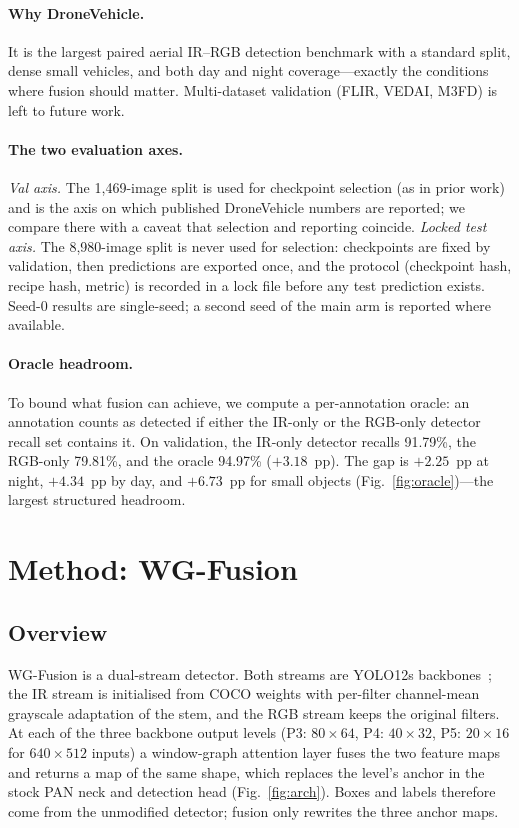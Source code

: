 \documentclass[10pt,twocolumn,letterpaper]{article}
\begin{document}
\paragraph{Why DroneVehicle.}
It is the largest paired aerial IR--RGB detection benchmark with a standard
split, dense small vehicles, and both day and night coverage---exactly the
conditions where fusion should matter. Multi-dataset validation (FLIR, VEDAI,
M3FD) is left to future work.

\paragraph{The two evaluation axes.}
\emph{Val axis.} The 1{,}469-image split is used for checkpoint selection (as
in prior work) and is the axis on which published DroneVehicle numbers are
reported; we compare there with a caveat that selection and reporting coincide.
\emph{Locked test axis.} The 8{,}980-image split is never used for selection:
checkpoints are fixed by validation, then predictions are exported once, and
the protocol (checkpoint hash, recipe hash, metric) is recorded in a lock file
before any test prediction exists. Seed-0 results are single-seed; a second
seed of the main arm is reported where available.

\paragraph{Oracle headroom.}
To bound what fusion can achieve, we compute a per-annotation oracle: an
annotation counts as detected if either the IR-only or the RGB-only detector
recall set contains it. On validation, the IR-only detector recalls 91.79\%,
the RGB-only 79.81\%, and the oracle 94.97\% ($+3.18$~pp). The gap is
$+2.25$~pp at night, $+4.34$~pp by day, and $+6.73$~pp for small objects
(Fig.~\ref{fig:oracle})---the largest structured headroom.

\section{Method: WG-Fusion}\label{sec:method}

\subsection{Overview}
WG-Fusion is a dual-stream detector. Both streams are YOLO12s
backbones~\cite{yolo12}; the IR stream is initialised from COCO weights with
per-filter channel-mean grayscale adaptation of the stem, and the RGB stream
keeps the original filters. At each of the three backbone output levels
(P3: $80\times64$, P4: $40\times32$, P5: $20\times16$ for $640\times512$
inputs) a window-graph attention layer fuses the two feature maps and returns a
map of the same shape, which replaces the level's anchor in the stock PAN neck
and detection head (Fig.~\ref{fig:arch}). Boxes and labels therefore come from
the unmodified detector; fusion only rewrites the three anchor maps.
\end{document}
